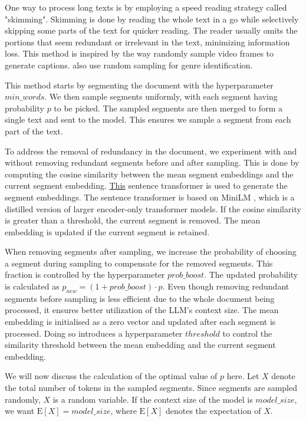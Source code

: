 		One way to process long texts is by employing a speed reading strategy called "skimming".
		Skimming is done by reading the whole text in a go while selectively skipping some parts of the
		text for quicker reading.
		The reader usually omits the portions that seem redundant or irrelevant in the text, minimizing
		information loss.
		This method is inspired by the way \citet{wang2024videoagent} randomly sample video frames to
		generate captions.
		\citet{worsham-kalita-2018-genre} also use random sampling for genre identification.

		This method starts by segmenting the document with the hyperparameter $min\_words$.
		We then sample segments uniformly, with each segment having probability $p$ to be picked.
		The sampled segments are then merged to form a single text and sent to the model.
		This ensures we sample a segment from each part of the text.

		To address the removal of redundancy in the document, we experiment with and without removing
		redundant segments before and after sampling.
		This is done by computing the cosine similarity between the mean segment embeddings and the
		current segment embedding.
		\href{https://huggingface.co/sentence-transformers/all-MiniLM-L6-v2}{This} sentence transformer
		is used to generate the segment embeddings.
		The sentence transformer is based on MiniLM \cite{wang2020minilm}, which is a distilled version
		of larger encoder-only transformer models.
		If the cosine similarity is greater than a threshold, the current segment is removed.
		The mean embedding is updated if the current segment is retained.

		When removing segments after sampling, we increase the probability of choosing a segment during
		sampling to compensate for the removed segments.
		This fraction is controlled by the hyperparameter $prob\_boost$.
		The updated probability is calculated as $p_{new} = (1 + prob\_boost) \cdot p$.
		Even though removing redundant segments before sampling is less efficient due to the whole document
		being processed, it ensures better utilization of the LLM's context size.
		The mean embedding is initialised as a zero vector and updated after each segment is processed.
		Doing so introduces a hyperparameter $threshold$ to control the similarity threshold between the
		mean embedding and the current segment embedding.

		We will now discuss the calculation of the optimal value of $p$ here.
		Let $X$ denote the total number of tokens in the sampled segments.
		Since segments are sampled randomly, $X$ is a random variable.
		If the context size of the model is $model\_size$, we want $\mathrm{E}[X] = model\_size$,
		where $\mathrm{E}[X]$ denotes the expectation of $X$.

